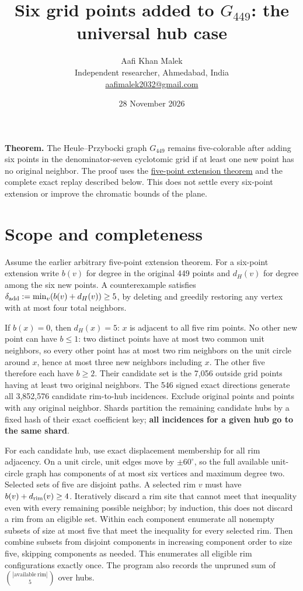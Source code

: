 \documentclass[10pt,letterpaper]{article}
\title{Six grid points added to \(G_{449}\): the universal hub case}
\author{Aafi Khan Malek\\ \small Independent researcher, Ahmedabad, India\\
\small\href{mailto:aafimalek2032@gmail.com}{aafimalek2032@gmail.com}}
\date{28 November 2026}
\begin{document}
\maketitle
\textbf{Theorem.} The Heule--Przybocki graph \(G_{449}\) remains
five-colorable after adding six points in the denominator-seven
cyclotomic grid if at least one new point has no original neighbor.
The proof uses the
\href{https://github.com/Aafimalek/novel-discoveries/tree/234e0ce194fdfa544d4b551ccea9898b2239dc69/hadwiger-nelson/verification/g449/prime-seven-catalogue/five-point-extensions}{five-point extension theorem}
and the complete exact replay described below. This does not settle
every six-point extension or improve the chromatic bounds of the plane.

\section{Scope and completeness}\label{scope-and-completeness}

Assume the earlier arbitrary five-point extension theorem. For a
six-point extension write \(b(v)\) for degree in the original 449 points
and \(d_H(v)\) for degree among the six new points. A counterexample
satisfies \(\delta_{\rm add}:=\min_v (b(v)+d_H(v))\ge5\), by deleting
and greedily restoring any vertex with at most four total neighbors.

If \(b(x)=0\), then \(d_H(x)=5\): \(x\) is adjacent to all five rim
points. No other new point can have \(b\le1\): two distinct points have
at most two common unit neighbors, so every other point has at most two
rim neighbors on the unit circle around \(x\), hence at most three new
neighbors including \(x\). The other five therefore each have \(b\ge2\).
Their candidate set is the 7,056 outside grid points having at least two
original neighbors. The 546 signed exact directions generate all
3,852,576 candidate rim-to-hub incidences. Exclude original points and
points with any original neighbor. Shards partition the remaining
candidate hubs by a fixed hash of their exact coefficient key;
\textbf{all incidences for a given hub go to the same shard}.

For each candidate hub, use exact displacement membership for all rim
adjacency. On a unit circle, unit edges move by \(\pm60^\circ\), so the
full available unit-circle graph has components of at most six vertices
and maximum degree two. Selected sets of five are disjoint paths. A
selected rim \(v\) must have \(b(v)+d_{\rm rim}(v)\ge4\). Iteratively
discard a rim site that cannot meet that inequality even with every
remaining possible neighbor; by induction, this does not discard a rim
from an eligible set. Within each component enumerate all nonempty
subsets of size at most five that meet the inequality for every selected
rim. Then combine subsets from disjoint components in increasing
component order to size five, skipping components as needed. This
enumerates all eligible rim configurations exactly once. The program
also records the unpruned sum of
\(\binom{|\mathrm{available\ rim}|}{5}\) over hubs.
\end{document}
